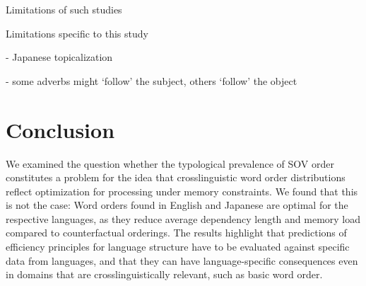\documentclass[11pt,a4paper]{article}
\begin{document}

Limitations of such studies

Limitations specific to this study

- Japanese topicalization

- some adverbs might `follow' the subject, others `follow' the object



\section{Conclusion}
We examined the question whether the typological prevalence of SOV order constitutes a problem for the idea that crosslinguistic word order distributions reflect optimization for processing under memory constraints.
We found that this is not the case: Word orders found in English and Japanese are optimal for the respective languages, as they reduce average dependency length and memory load compared to counterfactual orderings. %
The results highlight that predictions of efficiency principles for language structure have to be evaluated against specific data from languages, and that they can have language-specific consequences even in domains that are crosslinguistically relevant, such as basic word order.



%
\end{document}
